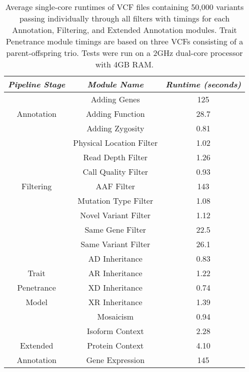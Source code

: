 \documentclass[twocolumn]{bmcart}%
\begin{document}
\begin{backmatter}


\begin{table}[t!]
\begin{tabular}{| c | *2c |} \hline %
\emph{Pipeline Stage} & \emph{Module Name} & \emph{Runtime (seconds)} \\
\hline
             & Adding Genes     & 125\\
Annotation   & Adding Function & 28.7\\
             & Adding Zygosity & 0.81\\
\hline
             & Physical Location Filter & 1.02 \\
             & Read Depth Filter        & 1.26 \\
             & Call Quality Filter      & 0.93\\
Filtering    & AAF Filter               & 143\\
             & Mutation Type Filter     & 1.08\\
             & Novel Variant Filter     & 1.12\\
             & Same Gene Filter       & 22.5\\
             & Same Variant Filter    & 26.1\\
\hline
             & AD Inheritance    & 0.83\\
 Trait       & AR Inheritance    & 1.22\\
Penetrance   & XD Inheritance    & 0.74\\
  Model      & XR Inheritance    & 1.39\\
             & Mosaicism         & 0.94\\
\hline
                 & Isoform Context      & 2.28\\
   Extended      & Protein Context      & 4.10\\
 Annotation      & Gene Expression      & 145\\
\hline
\end{tabular}
\vspace{1ex}
\caption{Average single-core runtimes of VCF files containing 50,000 variants passing individually through all filters with timings for each Annotation, Filtering, and Extended Annotation modules. Trait Penetrance module timings are based on three VCFs consisting of a parent-offspring trio. Tests were run on a 2GHz dual-core processor with 4GB RAM.}\label{table:results}
\end{table}





\end{backmatter}
\end{document}
